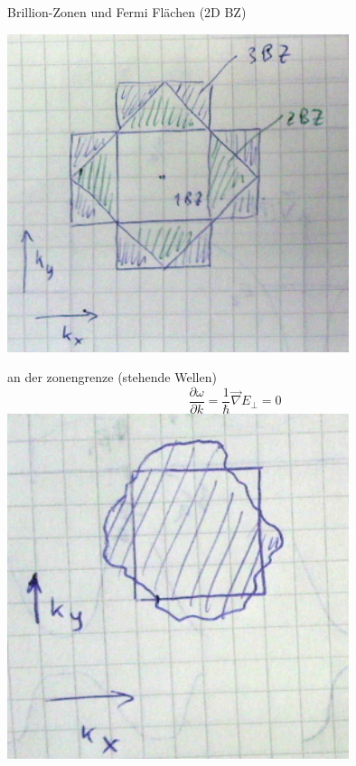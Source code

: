 Brillion-Zonen und Fermi Flächen (2D BZ)

\includegraphics[width=0.75\textwidth]{kap06_47.png}

an der zonengrenze (stehende Wellen)
\[\frac{\partial\omega}{\partial k}=\frac{1}{\hbar}\vec \nabla E_\bot =0\]
\includegraphics[width=0.75\textwidth]{kap06_48.png}





